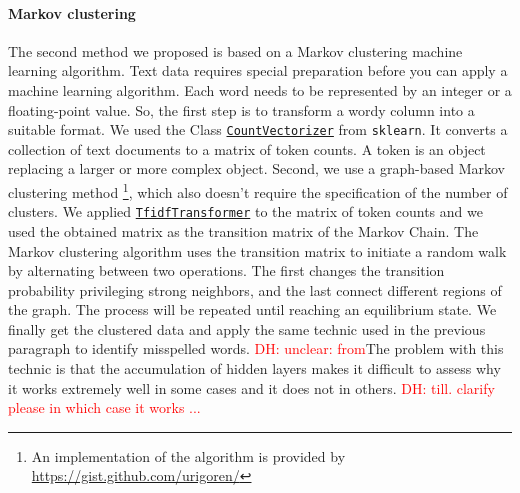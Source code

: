 \documentclass{article}
\newcommand\dhawat[1]{\textcolor{red}{DH: #1}}
\begin{document}
\paragraph{Markov clustering}
The second method we proposed is based on a Markov clustering machine learning algorithm.
Text data requires special preparation before you can apply a machine learning algorithm.
Each word needs to be represented by an integer or a floating-point value.
So, the first step is to transform a wordy column into a suitable format.
We used the Class \href{https://scikit-learn.org/stable/modules/generated/sklearn.feature_extraction.text.CountVectorizer.html}{\texttt{CountVectorizer}} from \texttt{sklearn}.
It converts a collection of text documents to a matrix of token counts.
A token is an object replacing a larger or more complex object.
Second, we use a graph-based Markov clustering method \footnote{An implementation of the algorithm is provided by \href{https://gist.github.com/urigoren/1f76567f3af56ed8c33f076537768a60}{https://gist.github.com/urigoren/}}, which also doesn't require the specification of the number of clusters.
We applied \href{https://scikit-learn.org/stable/modules/generated/sklearn.feature_extraction.text.TfidfTransformer.html}{\texttt{TfidfTransformer}} to the matrix of token counts and we used the obtained matrix as the transition matrix of the Markov Chain.
The Markov clustering algorithm uses the transition matrix to initiate a random walk by alternating between two operations.
The first changes the transition probability privileging strong neighbors, and the last connect different regions of the graph.
The process will be repeated until reaching an equilibrium state.
We finally get the clustered data and apply the same technic used in the previous paragraph to identify misspelled words.
\dhawat{unclear: from}The problem with this technic is that the accumulation of hidden layers makes it difficult to assess why it works extremely well in some cases and it does not in others. \dhawat{till. clarify please in which case it works ...}
\end{document}
